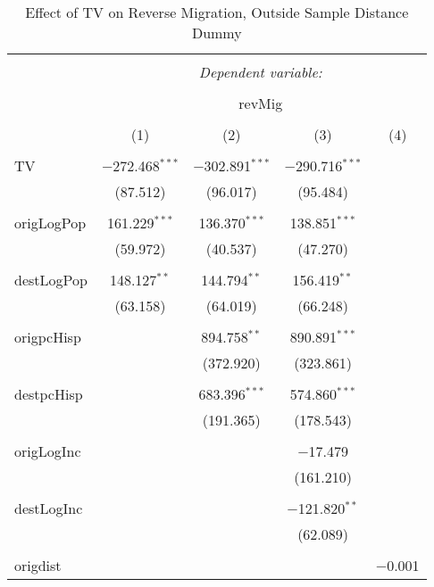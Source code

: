 
\begin{table}[!htbp] \centering 
  \caption{Effect of TV on Reverse Migration, Outside Sample Distance Dummy} 
  \label{} 
\begin{tabular}{@{\extracolsep{5pt}}lcccc} 
\\[-1.8ex]\hline 
\hline \\[-1.8ex] 
 & \multicolumn{4}{c}{\textit{Dependent variable:}} \\ 
\cline{2-5} 
\\[-1.8ex] & \multicolumn{4}{c}{revMig} \\ 
\\[-1.8ex] & (1) & (2) & (3) & (4)\\ 
\hline \\[-1.8ex] 
 TV & $-$272.468$^{***}$ & $-$302.891$^{***}$ & $-$290.716$^{***}$ &  \\ 
  & (87.512) & (96.017) & (95.484) &  \\ 
  & & & & \\ 
 origLogPop & 161.229$^{***}$ & 136.370$^{***}$ & 138.851$^{***}$ &  \\ 
  & (59.972) & (40.537) & (47.270) &  \\ 
  & & & & \\ 
 destLogPop & 148.127$^{**}$ & 144.794$^{**}$ & 156.419$^{**}$ &  \\ 
  & (63.158) & (64.019) & (66.248) &  \\ 
  & & & & \\ 
 origpcHisp &  & 894.758$^{**}$ & 890.891$^{***}$ &  \\ 
  &  & (372.920) & (323.861) &  \\ 
  & & & & \\ 
 destpcHisp &  & 683.396$^{***}$ & 574.860$^{***}$ &  \\ 
  &  & (191.365) & (178.543) &  \\ 
  & & & & \\ 
 origLogInc &  &  & $-$17.479 &  \\ 
  &  &  & (161.210) &  \\ 
  & & & & \\ 
 destLogInc &  &  & $-$121.820$^{**}$ &  \\ 
  &  &  & (62.089) &  \\ 
  & & & & \\ 
 origdist &  &  &  & $-$0.001 \\ 

\end{tabular}
\end{table}
